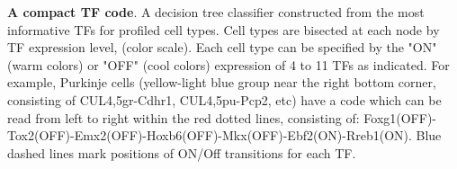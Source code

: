 \textbf{A compact TF code}. A decision tree classifier constructed from the most informative TFs for profiled cell types. Cell types are bisected at each node by TF expression level, (color scale). Each cell type can be specified by the "ON" (warm colors) or "OFF" (cool colors) expression of 4 to 11 TFs as indicated. For example, Purkinje cells  (yellow-light blue group near the right bottom corner, consisting of CUL4,5gr-Cdhr1, CUL4,5pu-Pcp2, etc) have a code which can be read from left to right within the red dotted lines, consisting of: Foxg1(OFF)-Tox2(OFF)-Emx2(OFF)-Hoxb6(OFF)-Mkx(OFF)-Ebf2(ON)-Rreb1(ON). Blue dashed lines mark positions of ON/Off transitions for each TF. 



